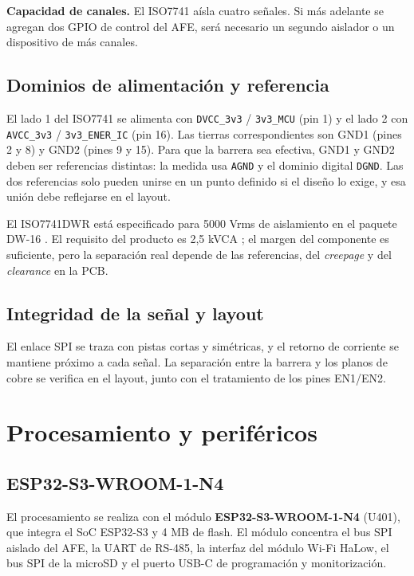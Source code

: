 \documentclass[11pt,a4paper]{article}
\begin{document}
\noindent\textbf{Capacidad de canales.} El ISO7741 aísla cuatro señales. Si más
adelante se agregan dos GPIO de control del AFE, será necesario un segundo
aislador o un dispositivo de más canales.

\subsection{Dominios de alimentación y referencia}

El lado 1 del ISO7741 se alimenta con \texttt{DVCC\_3v3} / \texttt{3v3\_MCU} (pin 1) y el lado 2 con
\texttt{AVCC\_3v3} / \texttt{3v3\_ENER\_IC} (pin 16). Las tierras correspondientes son GND1 (pines 2 y
8) y GND2 (pines 9 y 15). Para que la barrera sea efectiva, GND1 y GND2 deben
ser referencias distintas: la medida usa \texttt{AGND} y el dominio digital
\texttt{DGND}. Las dos referencias solo pueden unirse en un punto definido
si el diseño lo exige, y esa unión debe reflejarse en el layout.

El ISO7741DWR está especificado para 5000 Vrms de aislamiento en el paquete
DW-16 \cite{iso7741}. El requisito del producto es 2,5 kVCA \cite{rdem01}; el
margen del componente es suficiente, pero la separación real depende de las
referencias, del \emph{creepage} y del \emph{clearance} en la PCB.

\subsection{Integridad de la señal y layout}

El enlace SPI se traza con pistas cortas y simétricas, y el retorno de
corriente se mantiene próximo a cada señal. La separación entre la barrera y
los planos de cobre se verifica en el layout, junto con el tratamiento de los
pines EN1/EN2.
\section{Procesamiento y periféricos}
\label{sec:procesamiento}

\subsection{ESP32-S3-WROOM-1-N4}

El procesamiento se realiza con el módulo \textbf{ESP32-S3-WROOM-1-N4} (U401),
que integra el SoC ESP32-S3 y 4 MB de flash. El módulo concentra el bus SPI
aislado del AFE, la UART de RS-485, la interfaz del módulo Wi-Fi HaLow, el bus
SPI de la microSD y el puerto USB-C de programación y monitorización.
\end{document}
